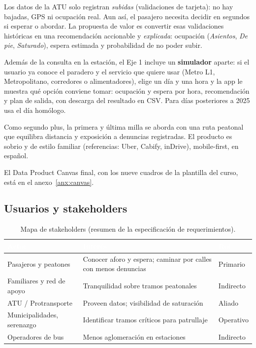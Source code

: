 \documentclass[11pt]{article}
\begin{document}
Los datos de la ATU solo registran \emph{subidas} (validaciones de tarjeta): no hay bajadas, GPS ni
ocupación real. Aun así, el pasajero necesita decidir en segundos si esperar o abordar. La propuesta
de valor es convertir esas validaciones históricas en una recomendación accionable y
\emph{explicada}: ocupación (\emph{Asientos}, \emph{De pie}, \emph{Saturado}), espera estimada y
probabilidad de no poder subir.

Además de la consulta en la estación, el Eje 1 incluye un \textbf{simulador} aparte: si el usuario ya conoce el paradero y el servicio que quiere usar (Metro L1, Metropolitano, corredores o alimentadores), elige un día y una hora y la app le muestra qué opción conviene tomar: ocupación y espera por hora, recomendación y plan de salida, con descarga del resultado en CSV. Para días posteriores a 2025 usa el día homólogo.

Como segundo plus, la primera y última milla se aborda con una ruta peatonal que equilibra distancia
y exposición a denuncias registradas. El producto es sobrio y de estilo familiar (referencias:
Uber, Cabify, inDrive), mobile-first, en español.

El Data Product Canvas final, con los nueve cuadros de la plantilla del curso, está en el anexo~\ref{anx:canvas}.

\subsection{Usuarios y stakeholders}

\begin{table}[H]
\centering\small
\begin{tabularx}{\textwidth}{@{}lXl@{}}
\toprule
\rowcolor{tablehead} \textcolor{white}{\bfseries Actor} & \textcolor{white}{\bfseries Interés} & \textcolor{white}{\bfseries Rol} \\
\midrule
Pasajeros y peatones & Conocer aforo y espera; caminar por calles con menos denuncias & Primario \\
\rowcolor{tablerow} Familiares y red de apoyo & Tranquilidad sobre tramos peatonales & Indirecto \\
ATU / Protransporte & Proveen datos; visibilidad de saturación & Aliado \\
\rowcolor{tablerow} Municipalidades, serenazgo & Identificar tramos críticos para patrullaje & Operativo \\
Operadores de bus & Menos aglomeración en estaciones & Indirecto \\
\bottomrule
\end{tabularx}
\caption{Mapa de stakeholders (resumen de la especificación de requerimientos).}
\end{table}
\end{document}
